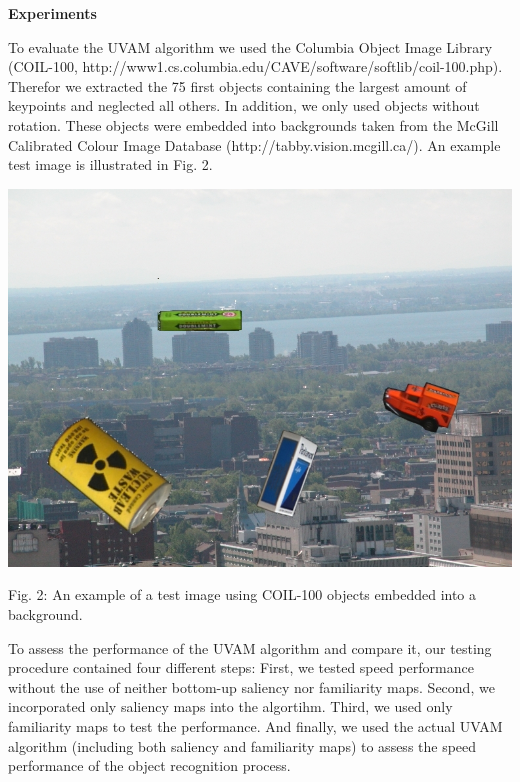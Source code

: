 \begin{center} \textbf{\Large Experiments} \end{center}
To evaluate the UVAM algorithm we used the Columbia Object Image Library (COIL-100, http://www1.cs.columbia.edu/CAVE/software/softlib/coil-100.php). Therefor we extracted the 75 first objects containing the largest amount of keypoints and neglected all others. In addition, we only used objects without rotation. These objects were embedded into backgrounds taken from the McGill Calibrated Colour Image Database (http://tabby.vision.mcgill.ca/). An example test image is illustrated in Fig. 2.\\
\begin{center}
	\includegraphics[scale=1.00]{img01.jpg}
	\caption{Fig. 2: An example of a test image using COIL-100 objects embedded into a background.}
	\label{fig:2}
\end{center}
To assess the performance of the UVAM algorithm and compare it, our testing procedure contained four different steps: First, we tested speed performance without the use of neither bottom-up saliency nor familiarity maps. Second, we incorporated only saliency maps into the algortihm. Third, we used only familiarity maps to test the performance. And finally, we used the actual UVAM algorithm (including both saliency and familiarity maps) to assess the speed performance of the object recognition process. 

